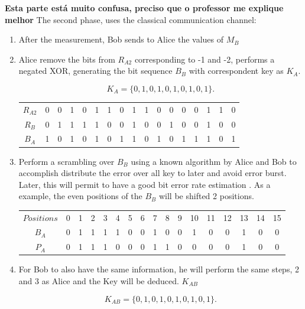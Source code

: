 \textbf{Esta parte está muito confusa, preciso que o professor me explique melhor}	
The second phase, uses the classical communication channel:
\begin{enumerate}

	\item After the measurement, Bob sends to Alice the values of $M_{B}$
	\item Alice remove the bits from $R_{A2}$ corresponding to -1 and -2, performs a negated XOR, generating the bit sequence $B_{B}$ with correspondent key as $K_{A}$.
	
  	$$ K_{A} = \{0,1,0,1,0,1,0,1,0,1\}.$$
	
	\begin{table}[H]
		\centering
		\begin{tabular}{c|c c c c c c c c c c c c c c c c}
			$R_{A2}$ & 0 & 0 & 1 & 0 & 1 & 1 & 0 & 1 & 1 & 0 & 0 & 0 & 0 & 1 & 1 & 0 \\
			$R_{B}$  & 0 & 1 & 1 & 1 & 1 & 0 & 0 & 1 & 0 & 0 & 1 & 0 & 0 & 1 & 0 & 0 \\ \hline
			$B_{A}$ & 1 & 0 & 1 & 0 & 1 & 0 & 1 & 1 & 0 & 1 & 0 & 1 & 1 & 1 & 0 & 1 \\
		\end{tabular}
	\end{table}
	
	\item Perform a scrambling over $B_{B}$ using a known algorithm by Alice and Bob to accomplish distribute the error over all key to later and avoid error burst. Later, this will permit to have a good bit error rate estimation \cite{SPREADING}. As a example, the even positions of the $B_{B}$ will be shifted 2 positions.
	\begin{tabular}{c|c c c c c c c c c c c c c c c c}
		$Positions$ & 0 & 1 & 2 & 3 & 4 & 5 & 6 & 7 & 8 & 9 & 10 & 11 & 12 & 13 & 14 & 15 \\
		$B_{A}$  & 0 & 1 & 1 & 1 & 1 & 0 & 0 & 1 & 0 & 0 & 1 & 0 & 0 & 1 & 0 & 0 \\
		$P_{A}$  & 0 & 1 & 1 & 1 & 0 & 0 & 0 & 1 & 1 & 0 & 0 & 0 & 0 & 1 & 0 & 0 \\
	\end{tabular}
			
	
	\item For Bob to also have the same information, he will perform the same steps, 2 and 3 as Alice and the Key will be deduced.  $K_{AB}$
	
  	$$ K_{AB} = \{0,1,0,1,0,1,0,1,0,1\}.$$
		
\end{enumerate}

